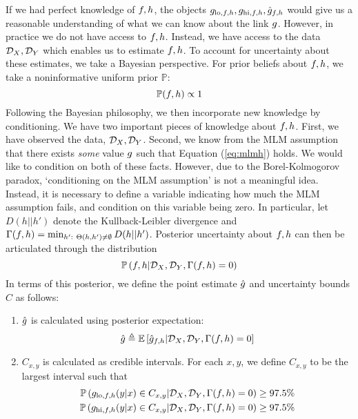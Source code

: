 If we had perfect knowledge of $f,h$, the objects $g_{\mathrm{lo},f,h}, g_{\mathrm{hi},f,h},\hat {g}_{f,h}$ would give us a reasonable understanding of what we can know about the link $g$.  However, in practice we do not have access to $f,h$.  Instead, we have access to the data ${\mathcal{D}_X},{\mathcal{D}_Y}$ which enables us to estimate $f,h$.  To account for uncertainty about these estimates, we take a Bayesian perspective.  For prior beliefs about $f,h$, we take a noninformative uniform prior $\mathbb{P}$:
\[
\mathbb{P}(f,h) \propto 1
\]
Following the Bayesian philosophy, we then incorporate new knowledge by conditioning.  We have two important pieces of knowledge about $f,h$.  First, we have observed the data, ${\mathcal{D}_X},{\mathcal{D}_Y}$.  Second, we know from the MLM assumption that there exists \emph{some} value $g$ such that Equation (\ref{eq:mlmh}) holds.  We would like to condition on both of these facts.  However, due to the Borel-Kolmogorov paradox, `conditioning on the MLM assumption' is not a meaningful idea.  Instead, it is necessary to define a variable indicating how much the MLM assumption fails, and condition on this variable being zero.  In particular, let $D(h||h')$ denote the Kullback-Leibler divergence and $\Gamma(f,h) = \min_{h':\ \Theta(h,h')\neq \emptyset} D(h||h')$.  Posterior uncertainty about $f,h$ can then be articulated through the distribution
\[
\mathbb{P}\left(f,h | {\mathcal{D}_X},{\mathcal{D}_Y},\Gamma(f,h)=0\right)
\]
In terms of this posterior, we define the \MLM{} point estimate $\hat {g}$ and uncertainty bounds $C$ as follows:
\begin{enumerate}
    \item $\hat {g}$ is calculated using posterior expectation:
    \[
    \hat {g} \triangleq \mathbb{E}\left[\hat {g}_{f,h} | {\mathcal{D}_X},{\mathcal{D}_Y},\Gamma(f,h)=0\right]
    \]
    \item $C_{x,y}$ is calculated as credible intervals.  For each $x,y$, we define $C_{x,y}$ to be the largest interval such that 
    \begin{align*}
    \mathbb{P}\left(g_{\mathrm{lo},f,h}(y|x) \in C_{x,y} | {\mathcal{D}_X},{\mathcal{D}_Y},\Gamma(f,h)=0\right)\geq 97.5\% \\
    \mathbb{P}\left(g_{\mathrm{hi},f,h}(y|x) \in C_{x,y} | {\mathcal{D}_X},{\mathcal{D}_Y},\Gamma(f,h)=0\right)\geq 97.5\% 
    \end{align*}
\end{enumerate}


